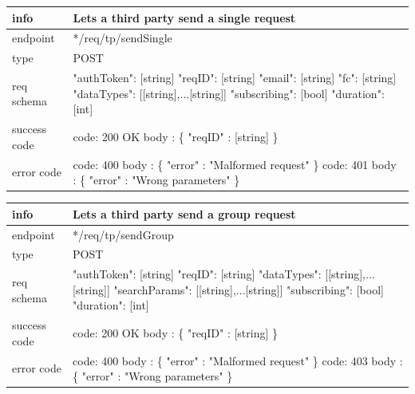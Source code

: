 \documentclass[titlepage]{article}
\begin{document}
\begin{tabularx}{\textwidth}{lX} \hline
    info & Lets a third party send a single request \\ \hline
    endpoint & */req/tp/sendSingle \\ \hline
    type & POST \\ \hline
    req schema & 
    "authToken": [string] \newline
    "reqID": [string] \newline
    "email": [string] \newline
    "fc": [string] \newline
    "dataTypes": [[string],...[string]] \newline
    "subscribing": [bool] \newline
    "duration": [int] \\ \hline
    success code &
        code: 200 OK \newline \newline 
        body : \{ \newline
        "reqID" : [string] \newline
        \} \\ \hline
    error code &
        code: 400 \newline
        body : \{ "error" : "Malformed request" \} \newline \newline
        code: 401 \newline
        body : \{ "error" : "Wrong parameters" \}
\end{tabularx}
		
\vspace{\baselineskip}

\begin{tabularx}{\textwidth}{lX} \hline
    info & Lets a third party send a group request \\ \hline
    endpoint & */req/tp/sendGroup \\ \hline
    type & POST \\ \hline
    req schema &
    "authToken": [string] \newline
    "reqID": [string] \newline
    "dataTypes": [[string],...[string]] \newline
    "searchParams": [[string],...[string]] \newline
    "subscribing": [bool] \newline
    "duration": [int] \\ \hline
    success code &
        code: 200 OK \newline \newline 
        body : \{ \newline
        "reqID" : [string] \newline
        \} \\ \hline
    error code &
        code: 400 \newline
        body : \{ "error" : "Malformed request" \} \newline \newline
        code: 403 \newline
        body : \{ "error" : "Wrong parameters" \}
\end{tabularx}
		
\end{document}
